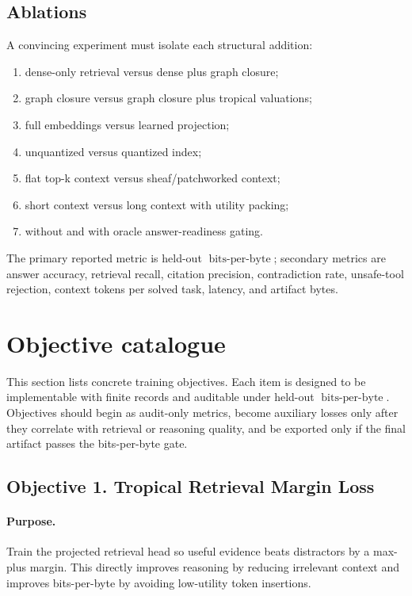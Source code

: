 \documentclass[11pt]{article}
\theoremstyle{definition}
\theoremstyle{remark}
\newcommand{\bits}{\ensuremath{\operatorname{bits\text{-}per\text{-}byte}}}
\begin{document}
\subsection{Ablations}

A convincing experiment must isolate each structural addition:
\begin{enumerate}
    \item dense-only retrieval versus dense plus graph closure;
    \item graph closure versus graph closure plus tropical valuations;
    \item full embeddings versus learned projection;
    \item unquantized versus quantized index;
    \item flat top-k context versus sheaf/patchworked context;
    \item short context versus long context with utility packing;
    \item without and with oracle answer-readiness gating.
\end{enumerate}
The primary reported metric is held-out \bits; secondary metrics are answer accuracy, retrieval recall, citation precision, contradiction rate, unsafe-tool rejection, context tokens per solved task, latency, and artifact bytes.

\section{Objective catalogue}

This section lists concrete training objectives. Each item is designed to be implementable with finite records and auditable under held-out \bits. Objectives should begin as audit-only metrics, become auxiliary losses only after they correlate with retrieval or reasoning quality, and be exported only if the final artifact passes the bits-per-byte gate.

\subsection{Objective 1. Tropical Retrieval Margin Loss}
\paragraph{Purpose.} Train the projected retrieval head so useful evidence beats distractors by a max-plus margin. This directly improves reasoning by reducing irrelevant context and improves bits-per-byte by avoiding low-utility token insertions.
\end{document}
